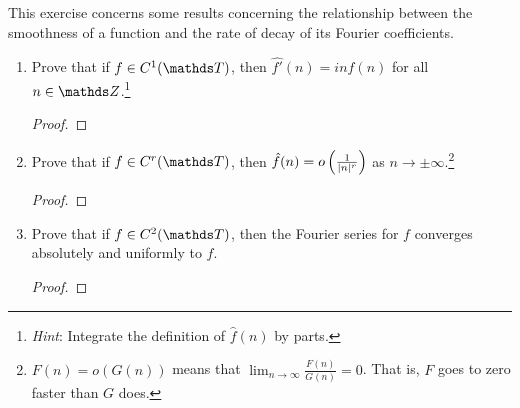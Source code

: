 \documentclass{../homework}
\begin{document}
\begin{Exercise}
  This exercise concerns some results concerning the relationship
  between the smoothness of a function and the rate of decay of its
  Fourier coefficients.
  \begin{enumerate}
  \item Prove that if \(f \in C^1(\T)\), then
    \(\widehat{f'}(n) = in \hat f(n)\) for all
    \(n \in \Z\).\footnote{\emph{Hint}: Integrate the definition of
      \(\hat{f}(n)\) by parts.}

    \begin{solution}
      \begin{proof}

      \end{proof}
    \end{solution}

  \item Prove that if \(f \in C^r(\T)\), then
    \(\hat f(n) = o\left( {\frac{1}{\lvert {n} \rvert^r}} \right)\) as
    \(n \to \pm \infty\).\footnote{\(F(n) = o(G(n))\) means that
      \(\lim_{n\to\infty} \frac{F(n)}{G(n)} = 0\).  That is, \(F\)
      goes to zero faster than \(G\) does.}

    \begin{solution}
      \begin{proof}

      \end{proof}
    \end{solution}

  \item Prove that if \(f \in C^2(\T)\), then the Fourier series for
    \(f\) converges absolutely and uniformly to \(f\).

    \begin{solution}
      \begin{proof}

      \end{proof}
    \end{solution}
  \end{enumerate}
\end{Exercise}
\end{document}

